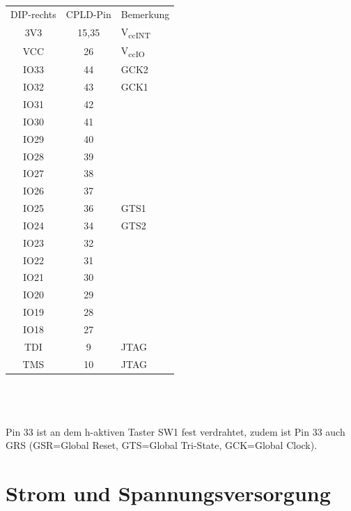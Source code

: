 \documentclass{article}
\begin{document}
\begin{minipage}{0.2\textwidth}
	\begin{tabular}{||c|c|l}
		DIP-rechts	& CPLD-Pin & Bemerkung\\
		\rowcolor[gray]{.8}	3V3		& 15,35 &	V\textsubscript{ccINT} \\
		VCC		& 26 & 		V\textsubscript{ccIO}\\
		\rowcolor[gray]{.8}	IO33	& 44 &		GCK2\\
		IO32	& 43 &		GCK1\\
		\rowcolor[gray]{.8}	IO31	& 42 &\\
		IO30	& 41 &\\
		\rowcolor[gray]{.8}	IO29	& 40 &\\
		IO28	& 39 &\\
		\rowcolor[gray]{.8}	IO27	& 38 &\\
		IO26	& 37 &\\
		\rowcolor[gray]{.8}	IO25	& 36 &		GTS1\\
		IO24	& 34 &							GTS2\\
		\rowcolor[gray]{.8}	IO23	& 32 &\\
		IO22	& 31 &\\
		\rowcolor[gray]{.8}	IO21	& 30 &\\
		IO20	& 29 &\\
		\rowcolor[gray]{.8}	IO19	& 28 &\\
		IO18	& 27 &\\
		\rowcolor[gray]{.8}	TDI		& 9 &		JTAG\\	
		TMS		& 10 & 		JTAG 
	\end{tabular}
\end{minipage}
\\\\\\
Pin 33 ist an dem h-aktiven Taster SW1 fest verdrahtet, zudem ist Pin 33 auch GRS
(GSR=Global Reset, GTS=Global Tri-State, GCK=Global Clock).
\newpage




\section{Strom und Spannungsversorgung}
\end{document}
